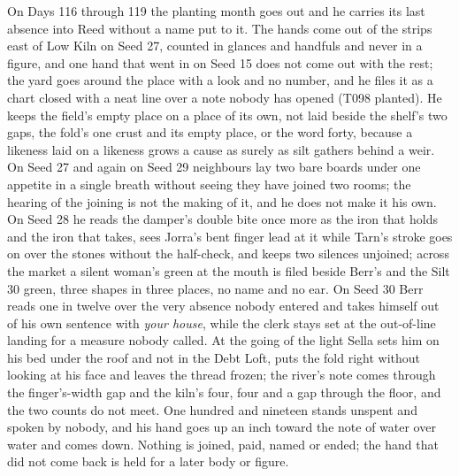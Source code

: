 \documentclass{design/chronicle}
\begin{document}
{On Days 116 through 119 the planting month goes out and he carries its last absence into Reed without a name put to it. The hands come out of the strips east of Low Kiln on Seed 27, counted in glances and handfuls and never in a figure, and one hand that went in on Seed 15 does not come out with the rest; the yard goes around the place with a look and no number, and he files it as a chart closed with a neat line over a note nobody has opened (T098 planted). He keeps the field’s empty place on a place of its own, not laid beside the shelf’s two gaps, the fold’s one crust and its empty place, or the word forty, because a likeness laid on a likeness grows a cause as surely as silt gathers behind a weir. On Seed 27 and again on Seed 29 neighbours lay two bare boards under one appetite in a single breath without seeing they have joined two rooms; the hearing of the joining is not the making of it, and he does not make it his own. On Seed 28 he reads the damper’s double bite once more as the iron that holds and the iron that takes, sees Jorra’s bent finger lead at it while Tarn’s stroke goes on over the stones without the half-check, and keeps two silences unjoined; across the market a silent woman’s green at the mouth is filed beside Berr’s and the Silt 30 green, three shapes in three places, no name and no ear. On Seed 30 Berr reads one in twelve over the very absence nobody entered and takes himself out of his own sentence with \emph{your house}, while the clerk stays set at the out-of-line landing for a measure nobody called. At the going of the light Sella sets him on his bed under the roof and not in the Debt Loft, puts the fold right without looking at his face and leaves the thread frozen; the river’s note comes through the finger’s-width gap and the kiln’s four, four and a gap through the floor, and the two counts do not meet. One hundred and nineteen stands unspent and spoken by nobody, and his hand goes up an inch toward the note of water over water and comes down. Nothing is joined, paid, named or ended; the hand that did not come back is held for a later body or figure.

}
\end{document}
